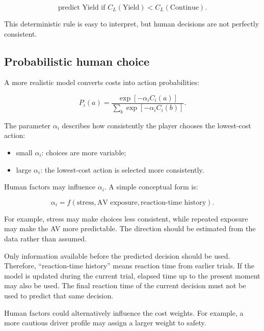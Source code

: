 \documentclass[11pt,a4paper]{article}
\begin{document}
\begin{equation}
\text{predict Yield if }
C_L(\mathrm{Yield})<C_L(\mathrm{Continue}).
\end{equation}

This deterministic rule is easy to interpret, but human decisions are not perfectly consistent.

\subsection{Probabilistic human choice}
\label{sec:behavioral}

A more realistic model converts costs into action probabilities:

\begin{equation}
P_i(a)
=
\frac{\exp[-\alpha_i C_i(a)]}
{\sum_b\exp[-\alpha_i C_i(b)]}.
\end{equation}

The parameter $\alpha_i$ describes how consistently the player chooses the lowest-cost action:

\begin{itemize}[noitemsep]
  \item small $\alpha_i$: choices are more variable;
  \item large $\alpha_i$: the lowest-cost action is selected more consistently.
\end{itemize}

Human factors may influence $\alpha_i$. A simple conceptual form is:

\begin{equation}
\alpha_i
=
f(\text{stress},\text{AV exposure},\text{reaction-time history}).
\end{equation}

For example, stress may make choices less consistent, while repeated exposure may make the AV more predictable. The direction should be estimated from the data rather than assumed.

Only information available before the predicted decision should be used. Therefore, ``reaction-time history'' means reaction time from earlier trials. If the model is updated during the current trial, elapsed time up to the present moment may also be used. The final reaction time of the current decision must not be used to predict that same decision.

Human factors could alternatively influence the cost weights. For example, a more cautious driver profile may assign a larger weight to safety.
\end{document}

